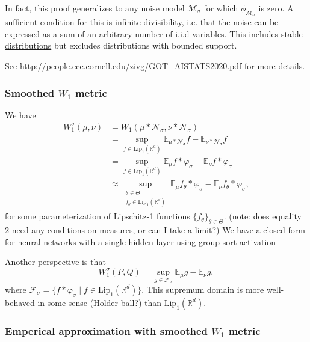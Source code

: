 \documentclass{article}
\newcommand{\R}{\mathbb{R}}
\newcommand{\E}{\mathbb{E}}
\newcommand{\Lip}{\mathrm{Lip}}
\newcommand{\N}{\mathcal{N}}
\begin{document}
In fact, this proof generalizes to any noise model $\mathcal{M}_\sigma$ for which $\phi_{\mathcal{M}_\sigma}$ is zero. A sufficient condition for this is \href{https://en.wikipedia.org/wiki/Infinite_divisibility_(probability)}{infinite divisibility}, i.e. that the noise can be expressed as a sum of an arbitrary number of i.i.d variables. This includes \href{https://en.wikipedia.org/wiki/Stable_distribution}{stable distributions} but excludes distributions with bounded support.

See \url{http://people.ece.cornell.edu/zivg/GOT_AISTATS2020.pdf} for more details.

\subsubsection{Smoothed \texorpdfstring{$W_1$}{W1} metric}
We have
\begin{align*}
    W_1^\sigma(\mu,\nu) &= W_1(\mu * \N_\sigma, \nu * \N_\sigma)\\
    &= \sup_{f \in \Lip_1(\R^d)} \E_{\mu * \N_\sigma} f - \E_{\nu * \N_\sigma}f\\
    &= \sup_{f \in \Lip_1(\R^d)} \E_{\mu} f * \varphi_\sigma - \E_{\nu} f * \varphi_\sigma\\
    &\approx \sup_{\substack{\theta \in \Theta\\f_\theta \in \Lip_1(\R^d)}} \E_\mu f_\theta * \varphi_\sigma - \E_\nu f_\theta * \varphi_\sigma,
\end{align*}
for some parameterization of Lipschitz-1 functions $\{f_\theta\}_{\theta \in \Theta}$. (note: does equality 2 need any conditions on measures, or can I take a limit?) We have a closed form for neural networks with a single hidden layer using \href{https://arxiv.org/pdf/1811.05381.pdf}{group sort activation}

Another perspective is that
\begin{equation*}
    W_1^\sigma(P,Q) = \sup_{g \in \mathcal{F}_\sigma} \E_\mu g - \E_\nu g,
\end{equation*}
where $\mathcal{F}_\sigma = \{ f * \varphi_\sigma \mid f \in \Lip_1(\R^d)\}$. This supremum domain is more well-behaved in some sense (H\:older ball?) than $\Lip_1(\R^d)$. 

\subsubsection{Emperical approximation with smoothed \texorpdfstring{$W_1$}{W1} metric}
\end{document}
